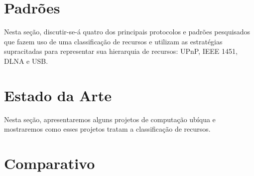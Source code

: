 \section{Padrões}

Nesta seção, discutir-se-á quatro dos principais protocolos e padrões pesquisados que fazem uso de uma classificação de recursos e utilizam as estratégias supracitadas para representar sua hierarquia de recursos: UPnP, IEEE 1451, DLNA e USB. 






\section{Estado da Arte}
Nesta seção, apresentaremos alguns projetos de computação ubíqua e mostraremos como esses projetos tratam a classificação de recursos.




\section{Comparativo}
